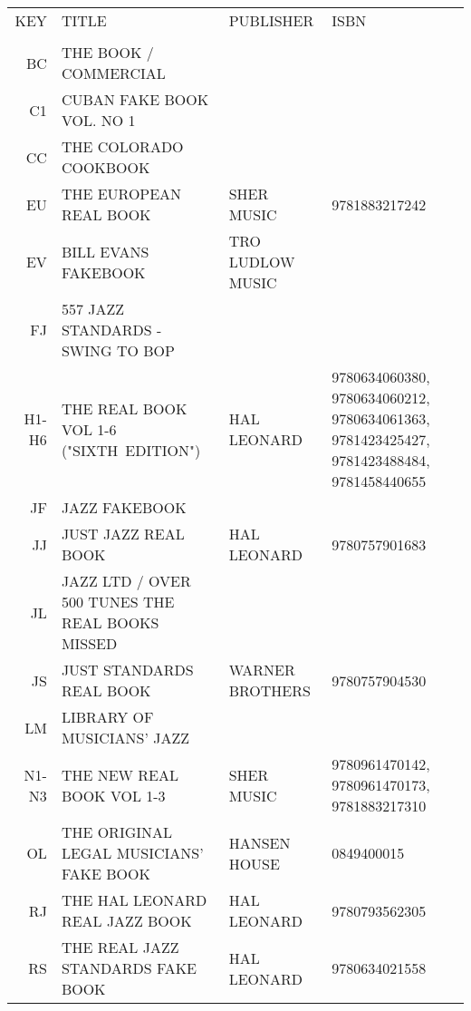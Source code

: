 \documentclass[8pt]{scrartcl}
\begin{document}
\selectfont
\begin{center}
  \begin{tabular}{rp{}p{}p{}}%
    KEY   & TITLE                                           & PUBLISHER          & ISBN \\
          &                                                 &                    & \\
    BC    & THE BOOK / COMMERCIAL                           &                    & \\
    C1    & CUBAN FAKE BOOK VOL. NO 1                       &                    & \\
    CC    & THE COLORADO COOKBOOK                           &                    & \\
    EU    & THE EUROPEAN REAL BOOK                          & SHER MUSIC         & 9781883217242 \\
    EV    & BILL EVANS FAKEBOOK                             & TRO LUDLOW MUSIC   & \\
    FJ    & 557 JAZZ STANDARDS - SWING TO BOP               &                    & \\
    H1-H6 & THE REAL BOOK VOL 1-6 ("SIXTH~EDITION")         & HAL LEONARD        & 9780634060380, 9780634060212, 9780634061363, 9781423425427, 9781423488484, 9781458440655 \\
    JF    & JAZZ FAKEBOOK                                   &                    & \\
    JJ    & JUST JAZZ REAL BOOK                             & HAL LEONARD        & 9780757901683 \\
    JL    & JAZZ LTD / OVER 500 TUNES THE REAL BOOKS MISSED &                    & \\
    JS    & JUST STANDARDS REAL BOOK                        & WARNER BROTHERS    & 9780757904530 \\
    LM    & LIBRARY OF MUSICIANS’ JAZZ                      &                    & \\
    N1-N3 & THE NEW REAL BOOK VOL 1-3                       & SHER MUSIC         & 9780961470142, 9780961470173, 9781883217310 \\
    OL    & THE ORIGINAL LEGAL MUSICIANS' FAKE BOOK         & HANSEN HOUSE       & 0849400015 \\
    RJ    & THE HAL LEONARD REAL JAZZ BOOK                  & HAL LEONARD        & 9780793562305 \\
    RS    & THE REAL JAZZ STANDARDS FAKE BOOK               & HAL LEONARD        & 9780634021558 \\

\end{tabular}
\end{center}
\end{document}
